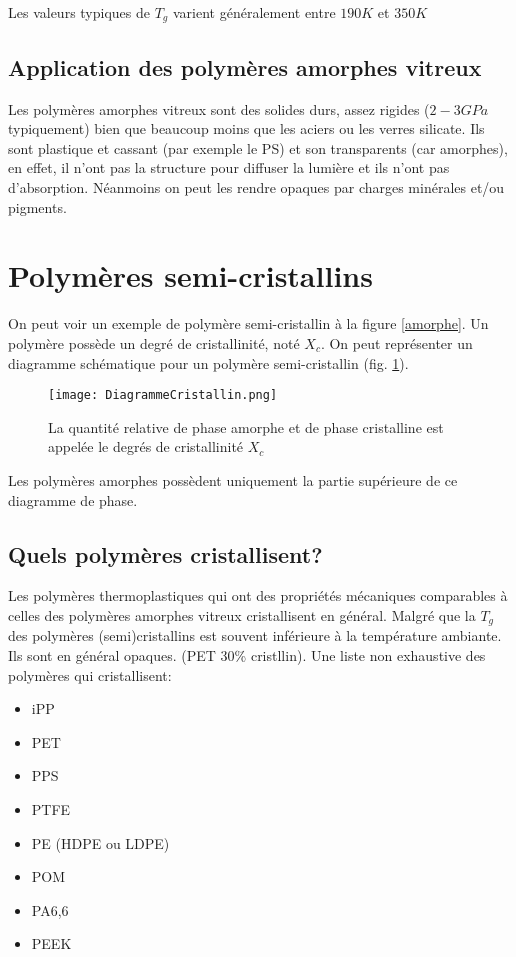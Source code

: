 \documentclass[../main.tex]{subfiles}
\begin{document}
	Les valeurs typiques de $T_g$ varient généralement entre $190K$ et $350K$
	\subsection{Application des polymères amorphes vitreux}
	Les polymères amorphes vitreux sont des solides durs, assez rigides ($2-3GPa$ typiquement) bien que beaucoup moins que les aciers ou les verres silicate. Ils sont plastique et cassant (par exemple le PS) et son transparents (car amorphes), en effet, il n'ont pas la structure pour diffuser la lumière et ils n'ont pas d'absorption. Néanmoins on peut les rendre opaques par charges minérales et/ou pigments.
	\section{Polymères semi-cristallins}
	On peut voir un exemple de polymère semi-cristallin à la figure \ref{amorphe}. Un polymère possède un degré de cristallinité, noté $X_c$. On peut représenter un diagramme schématique pour un polymère semi-cristallin (fig. \ref{diagrammecristallin}).

	\begin{figure}
		\begin{center}
			\texttt{[image: DiagrammeCristallin.png]}
			\caption{\label{diagrammecristallin}La quantité relative de phase amorphe et de phase cristalline est appelée le degrés de cristallinité $X_c$}
		\end{center}
	\end{figure} 
	Les polymères amorphes possèdent uniquement la partie supérieure de ce diagramme de phase.
	
	\subsection{Quels polymères cristallisent?}
	Les polymères thermoplastiques qui ont des propriétés mécaniques comparables à celles des polymères amorphes vitreux cristallisent en général. Malgré que la $T_g$ des polymères (semi)cristallins est souvent inférieure à la température ambiante. Ils sont en général opaques. (PET 30\% cristllin). Une liste non exhaustive des polymères qui cristallisent:
	\begin{itemize}
		\item iPP
		\item PET
		\item PPS
		\item PTFE
		\item PE (HDPE ou LDPE)
		\item POM
		\item PA6,6
		\item PEEK
	\end{itemize}
\end{document}
